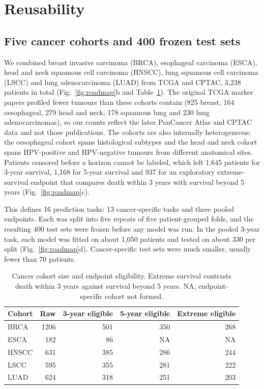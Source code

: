 \documentclass[pdflatex,sn-nature]{sn-jnl}
\begin{document}
\section*{Reusability}

\subsection*{Five cancer cohorts and 400 frozen test sets}

We combined breast invasive carcinoma (BRCA), esophageal carcinoma (ESCA), head and neck squamous cell carcinoma (HNSCC), lung squamous cell carcinoma (LSCC) and lung adenocarcinoma (LUAD) from TCGA and CPTAC, 3,238 patients in total (Fig.~\ref{fig:roadmap}b and Table~\ref{tab:cohorts}).\citep{tcga2012brca,tcga2017esca,tcga2015hnsc,tcga2012lusc,tcga2014luad,liu2018clinical,li2023pancancer} The original TCGA marker papers profiled fewer tumours than these cohorts contain (825 breast, 164 oesophageal, 279 head and neck, 178 squamous lung and 230 lung adenocarcinomas),\citep{tcga2012brca,tcga2017esca,tcga2015hnsc,tcga2012lusc,tcga2014luad} so our counts reflect the later PanCancer Atlas and CPTAC data and not those publications. The cohorts are also internally heterogeneous: the oesophageal cohort spans histological subtypes and the head and neck cohort spans HPV-positive and HPV-negative tumours from different anatomical sites.\citep{tcga2017esca,tcga2015hnsc} Patients censored before a horizon cannot be labeled, which left 1,645 patients for 3-year survival, 1,168 for 5-year survival and 937 for an exploratory extreme-survival endpoint that compares death within 3 years with survival beyond 5 years (Fig.~\ref{fig:roadmap}c).

This defines 16 prediction tasks: 13 cancer-specific tasks and three pooled endpoints. Each was split into five repeats of five patient-grouped folds, and the resulting 400 test sets were frozen before any model was run. In the pooled 3-year task, each model was fitted on about 1,050 patients and tested on about 330 per split (Fig.~\ref{fig:roadmap}d). Cancer-specific test sets were much smaller, usually fewer than 70 patients.

\begin{table}[ht]
\centering
\caption{Cancer cohort size and endpoint eligibility. Extreme survival contrasts death within 3 years against survival beyond 5 years. NA, endpoint-specific cohort not formed.}
\label{tab:cohorts}
\begin{tabular}{lrrrr}
\toprule
Cohort & Raw & 3-year eligible & 5-year eligible & Extreme eligible \\
\midrule
BRCA & 1206 & 501 & 350 & 268 \\
ESCA & 182 & 86 & NA & NA \\
HNSCC & 631 & 385 & 286 & 244 \\
LSCC & 595 & 355 & 281 & 222 \\
LUAD & 624 & 318 & 251 & 203 \\
\bottomrule
\end{tabular}

\end{table}
\end{document}
